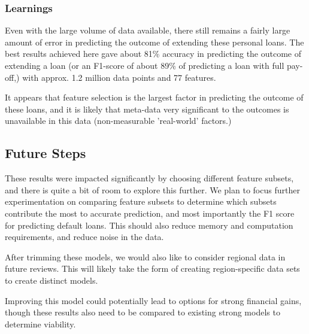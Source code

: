\subsubsection{Learnings}

Even with the large volume of data available, there still remains a fairly large amount of error in predicting the outcome of extending these personal loans. The best results achieved here gave about 81\% accuracy in predicting the outcome of extending a loan (or an F1-score of about 89\% of predicting a loan with full pay-off,) with approx. 1.2 million data points and 77 features.

It appears that feature selection is the largest factor in predicting the outcome of these loans, and it is likely that meta-data very significant to the outcomes is unavailable in this data (non-measurable 'real-world' factors.)

\subsection{Future Steps}

These results were impacted significantly by choosing different feature subsets, and there is quite a bit of room to explore this further. We plan to focus further experimentation on comparing feature subsets to determine which subsets contribute the most to accurate prediction, and most importantly the F1 score for predicting default loans. This should also reduce memory and computation requirements, and reduce noise in the data.

After trimming these models, we would also like to consider regional data in future reviews. This will likely take the form of creating region-specific data sets to create distinct models.

Improving this model could potentially lead to options for strong financial gains, though these results also need to be compared to existing strong models to determine viability.

